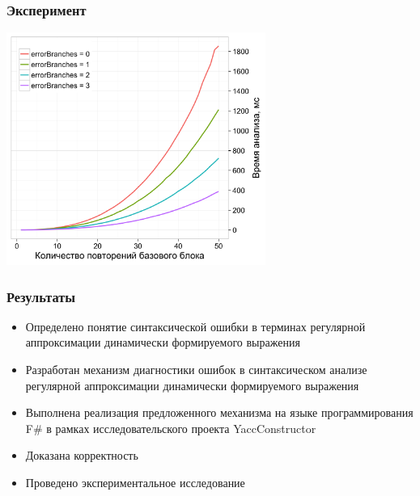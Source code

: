 \documentclass{beamer}
\begin{document}
\begin{frame}[t]
  \transwipe[direction=90]
  \frametitle{Эксперимент}
    \begin{center}
        \includegraphics[width=240pt]{pictures/error_branches4.png}
    \end{center}
     

\end{frame}


\begin{frame}
  \transwipe[direction=90]
  \frametitle{Результаты}
  \begin{itemize}
    \item Определено понятие синтаксической ошибки в терминах регулярной аппроксимации динамически формируемого выражения
    \item Разработан механизм диагностики ошибок в синтаксическом анализе регулярной аппроксимации динамически формируемого выражения
    \item Выполнена реализация предложенного механизма на языке программирования F\# в рамках исследовательского проекта YaccConstructor
    \item Доказана корректность
    \item Проведено экспериментальное исследование
  \end{itemize}
\end{frame}
\end{document}
